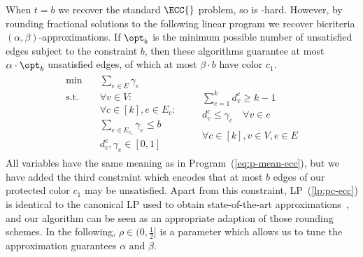 When $t = b$ we recover the standard $\ECC{}$ problem, so \pcECC{} is -hard.
However, by rounding fractional solutions to the following linear program we recover bicriteria $(\alpha, \beta)$-approximations. If $\opt_b$ is the minimum possible number of unsatisfied edges subject to the constraint $b$, then these algorithms guarantee at most $\alpha\cdot\opt_b$ unsatisfied edges, of which at most $\beta\cdot b$ have color $c_1$.
\begin{align}
	\label{lp:pc-ecc}
\begin{aligned}
	\text{min} \quad& \textstyle \sum_{e \in E} \gamma_e \\[4pt]
	\text{s.t.} \quad& \forall v \in V:\\[6pt]
	&\forall c \in [k], e \in E_c:\\[2pt]
    &\textstyle\sum_{e \in E_{c_1}} \gamma_e \leq b \\[1pt]
	&d_v^c, \gamma_e \in [0, 1]
\end{aligned}
\begin{aligned}
	&\\[2pt]
	&\textstyle \sum_{c=1}^k d_v^c \geq k - 1 \\[5pt]
	\quad &d_v^c \leq \gamma_e \quad \forall v \in e \\
    & \\[4pt]
	&\forall c \in [k], v \in V, e \in E
\end{aligned}
\end{align}
All variables have the same meaning as in Program~(\ref{eq:p-mean-ecc}), but we have added the third constraint which encodes that at most $b$ edges of our protected color $c_1$ may be unsatisfied.
Apart from this constraint, LP~(\ref{lp:pc-ecc}) is identical to the canonical \minecc{} LP used to obtain
state-of-the-art approximations~\cite{amburg2020clustering,veldt2023optimal}, and our algorithm can be seen as
an appropriate adaption of those rounding schemes. In the following, $\rho \in (0, \frac{1}{2}]$ is a parameter which allows us to tune the approximation guarantees $\alpha$ and $\beta$.

